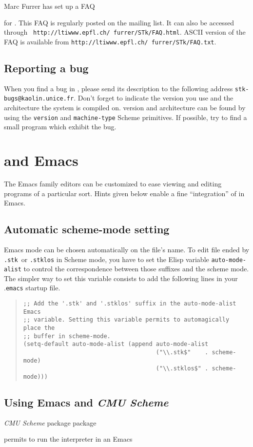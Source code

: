 Marc Furrer has set up a FAQ{ for {\stk}. 
This FAQ is regularly posted on the {\stk} mailing list. It can
also be accessed through  {\tt
http://ltiwww.epfl.ch/~furrer/STk/FAQ.html}. ASCII version of the FAQ is
available from {\tt http://ltiwww.epfl.ch/~furrer/STk/FAQ.txt}.

\subsection{Reporting a bug}

When you find a bug in {\stk}, please send its description to the following
address {\tt stk-bugs@kaolin.unice.fr}. Don't forget to indicate the version
you use and the architecture the system is compiled on.  {\stk} version and
architecture can be found by using the {\tt version} and {\tt machine-type}
Scheme primitives. If possible, try to find a small program which exhibit the bug.

\section{{\stk} and Emacs}

The Emacs family editors can be customized to ease
viewing and editing programs of a particular sort. Hints given below
enable a fine ``integration'' of {\stk} in Emacs.

\subsection*{Automatic scheme-mode setting}

Emacs mode can be chosen automatically on the file's name. To edit file
ended by {\tt .stk }or {\tt .stklos} in Scheme mode, you have to set the
Elisp variable {\tt auto-mode-alist} to control the correspondence between
those suffixes and the scheme mode. The simpler way to set this variable
consists to add the following lines in your .{\tt emacs} startup file.


\begin{quote}
\begin{verbatim}
;; Add the '.stk' and '.stklos' suffix in the auto-mode-alist Emacs
;; variable. Setting this variable permits to automagically place the
;; buffer in scheme-mode.
(setq-default auto-mode-alist (append auto-mode-alist 
                                      ("\\.stk$"    . scheme-mode)
                                      ("\\.stklos$" . scheme-mode)))
\end{verbatim}
\end{quote}

\subsection*{Using Emacs and {\em CMU Scheme}}

{\em CMU Scheme} package package} permits to run the {\stk} interpreter in an Emacs
